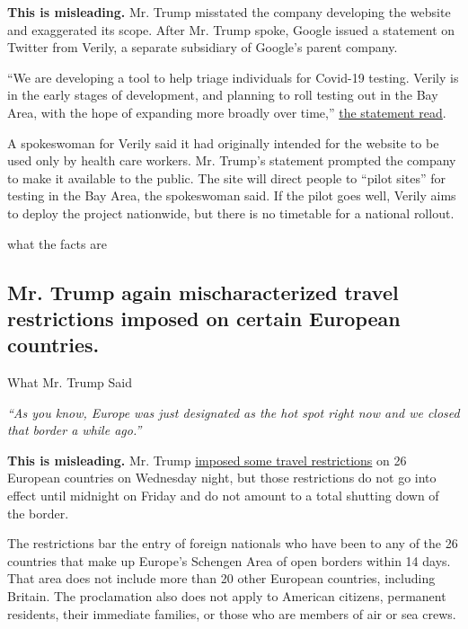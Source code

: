 \textbf{This is misleading.} Mr. Trump misstated the company developing
the website and exaggerated its scope. After Mr. Trump spoke, Google
issued a statement on Twitter from Verily, a separate subsidiary of
Google's parent company.

``We are developing a tool to help triage individuals for Covid-19
testing. Verily is in the early stages of development, and planning to
roll testing out in the Bay Area, with the hope of expanding more
broadly over time,''
\href{https://twitter.com/Google_Comms/status/1238574670686928906}{the
statement read}.

A spokeswoman for Verily said it had originally intended for the website
to be used only by health care workers. Mr. Trump's statement prompted
the company to make it available to the public. The site will direct
people to ``pilot sites'' for testing in the Bay Area, the spokeswoman
said. If the pilot goes well, Verily aims to deploy the project
nationwide, but there is no timetable for a national rollout.

what the facts are

\hypertarget{mr-trump-again-mischaracterized-travel-restrictions-imposed-on-certain-european-countries}{%
\subsection{Mr. Trump again mischaracterized travel restrictions imposed
on certain European
countries.}\label{mr-trump-again-mischaracterized-travel-restrictions-imposed-on-certain-european-countries}}

What Mr. Trump Said

\emph{``As you know, Europe was just designated as the hot spot right
now and we closed that border a while ago.''}

\textbf{This is misleading.} Mr. Trump
\href{https://www.whitehouse.gov/presidential-actions/proclamation-suspension-entry-immigrants-nonimmigrants-certain-additional-persons-pose-risk-transmitting-2019-novel-coronavirus/}{imposed
some travel restrictions} on 26 European countries on Wednesday night,
but those restrictions do not go into effect until midnight on Friday
and do not amount to a total shutting down of the border.

The restrictions bar the entry of foreign nationals who have been to any
of the 26 countries that make up Europe's Schengen Area of open borders
within 14 days. That area does not include more than 20 other European
countries, including Britain. The proclamation also does not apply to
American citizens, permanent residents, their immediate families, or
those who are members of air or sea crews.

